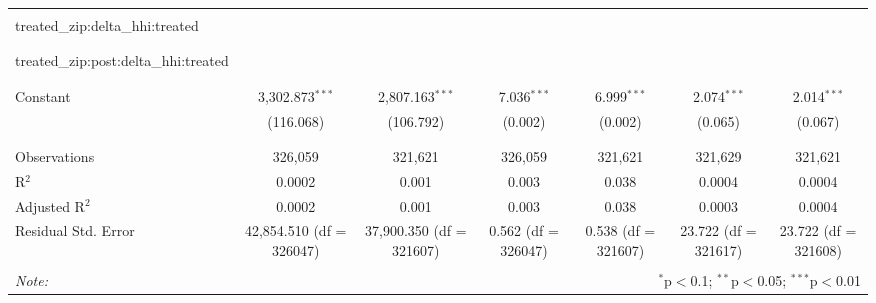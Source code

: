 \begin{table}[H]
{\begin{tabular}{@{\extracolsep{5pt}}lcccccc}
   & & & & & & \\  

  treated\_zip:delta\_hhi:treated &  &  &  &  &  &  \\  

   &  &  &  &  &  &  \\  

   & & & & & & \\  

  treated\_zip:post:delta\_hhi:treated &  &  &  &  &  &  \\  

   &  &  &  &  &  &  \\  

   & & & & & & \\  

  Constant & 3,302.873$^{***}$ & 2,807.163$^{***}$ & 7.036$^{***}$ & 6.999$^{***}$ & 2.074$^{***}$ & 2.014$^{***}$ \\  

   & (116.068) & (106.792) & (0.002) & (0.002) & (0.065) & (0.067) \\  

   & & & & & & \\  

 \hline \\[-1.8ex]  

 Observations & 326,059 & 321,621 & 326,059 & 321,621 & 321,629 & 321,621 \\  

 R$^{2}$ & 0.0002 & 0.001 & 0.003 & 0.038 & 0.0004 & 0.0004 \\  

 Adjusted R$^{2}$ & 0.0002 & 0.001 & 0.003 & 0.038 & 0.0003 & 0.0004 \\  

 Residual Std. Error & 42,854.510 (df = 326047) & 37,900.350 (df = 321607) & 0.562 (df = 326047) & 0.538 (df = 321607) & 23.722 (df = 321617) & 23.722 (df = 321608) \\  

 \hline  

 \hline \\[-1.8ex]  

 \textit{Note:}  & \multicolumn{6}{r}{$^{*}$p$<$0.1; $^{**}$p$<$0.05; $^{***}$p$<$0.01} \\  

 \end{tabular}}  

 \end{table}  

 

